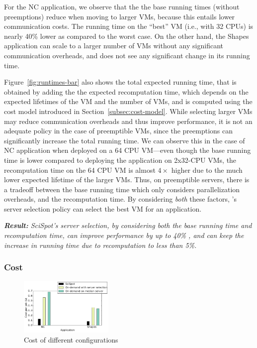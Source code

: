 For the NC application, we observe that the the base running times (without preemptions) reduce when moving to larger VMs, because this entails lower communication costs.
The running time on the ``best'' VM (i.e., with 32 CPUs) is nearly 40\% lower as compared to the worst case. 
On the other hand, the Shapes application can scale to a larger number of VMs without any significant communication overheads, and does not see any significant change in its running time.

Figure~\ref{fig:runtimes-bar} also shows the total expected running time, that is obtained by adding the the expected recomputation time, which depends on the expected lifetimes of the VM and the number of VMs, and is computed using the cost model introduced in Section~\ref{subsec:cost-model}. 
While selecting larger VMs may reduce communication overheads and thus improve performance, it is not an adequate policy in the case of preemptible VMs, since the preemptions can significantly increase the total running time.
We can observe this in the case of NC application when deployed on a 64 CPU VM---even though the base running time is lower compared to deploying the application on 2x32-CPU VMs, the recomputation time on the 64 CPU VM is almost $4\times$ higher due to the much lower expected lifetime of the larger VMs. 
Thus, on preemptible servers, there is a tradeoff between the base running time which only considers parallelization overheads, and the recomputation time.
By considering \emph{both} these factors, \sysname's server selection policy can select the best VM for an application. 


\noindent \emph{ \textbf{Result:} SciSpot's server selection, by considering both the base running time and recomputation time, can improve performance by up to 40\% , and can keep the increase in running time due to recomputation to less than 5\%.}


\subsubsection{Cost}

\begin{figure}
  \centering
  \includegraphics[width=0.4\textwidth]{../graphs/cost-only-bar.pdf}
  \caption{Cost of different configurations}
  \label{fig:cost-only-bar}
\end{figure}


